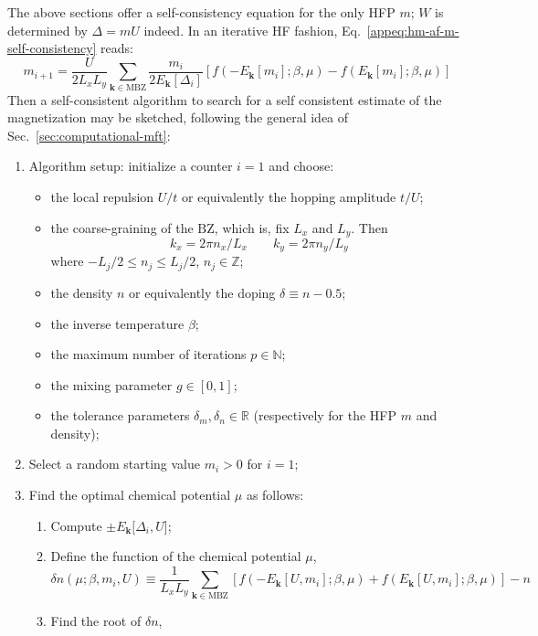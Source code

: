 The above sections offer a self-consistency equation for the only HFP $m$; $W$ is determined by $\Delta = mU$ indeed. In an iterative HF fashion, Eq.~\eqref{appeq:hm-af-m-self-consistency} reads:
\begin{equation}\label{appeq:hm-af-m-self-consistency-iterative}
	m_{i+1} =
	\frac{U}{2L_x L_y} \sum_{\mathbf{k} \in \mathrm{MBZ}} \frac{m_i}{2E_\mathbf{k}[\Delta_i]} \left[
	f(-E_\mathbf{k}[m_i];\beta,\mu)-f(E_\mathbf{k}[m_i];\beta,\mu)
	\right]
\end{equation}
Then a self-consistent algorithm to search for a self consistent estimate of the magnetization may be sketched, following the general idea of Sec.~\ref{sec:computational-mft}:
\begin{enumerate}
	\item Algorithm setup: initialize a counter $i=1$ and choose:
	\begin{itemize}
		\item the local repulsion $U/t$ or equivalently the hopping amplitude $t/U$;
		\item the coarse-graining of the $\mathrm{BZ}$, which is, fix $L_x$ and $L_y$. Then 
		\[ 
			k_x = 2\pi n_x/L_x
			\qquad
			k_y = 2\pi n_y/L_y 
		\]
		where $-L_j/2 \le n_j \le L_j/2$, $n_j \in \mathbb{Z}$;
		\item the density $n$ or equivalently the doping $\delta \equiv n-0.5$;
		\item the inverse temperature $\beta$;
		\item the maximum number of iterations $p \in \mathbb{N}$; 
		\item the mixing parameter $g \in [0,1]$;
		\item the tolerance parameters $\delta_m, \delta_n \in \mathbb{R}$ (respectively for the HFP $m$ and density);
	\end{itemize}
	\item Select a random starting value $m_i > 0$ for $i=1$;
	\item Find the optimal chemical potential $\mu$ as follows:
	\begin{enumerate}
		\item Compute $\pm E_\mathbf{k}[\Delta_i, U$]; 
		\item Define the function of the chemical potential $\mu$,
		\[
			\delta n(\mu; \beta, m_i, U) \equiv \frac{1}{L_x L_y} \sum_{\mathbf{k} \in \mathrm{MBZ}} \left[
			f\left(-E_\mathbf{k}[U,m_i]; \beta,\mu \right) + f \left( E_\mathbf{k}[U,m_i]; \beta,\mu \right)
			\right] - n
		\]
		\item Find the root of $\delta n$, 

\end{enumerate}
\end{enumerate}
